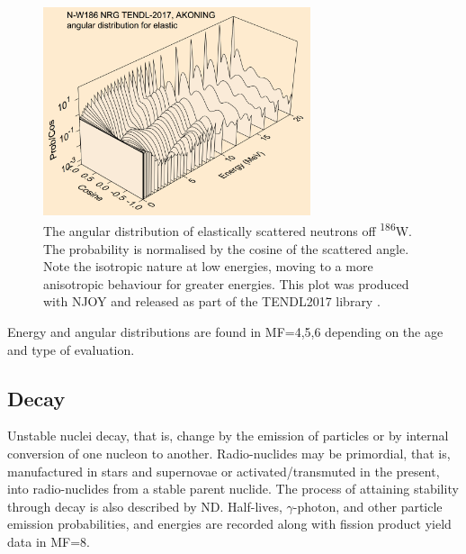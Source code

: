 \begin{figure}[ht]
  \centering
  \includegraphics[width=0.7\textwidth]{tungsten_scatter}
  \caption[Neutron elastic scattering angular distribution for $^{186}$W.]{The angular distribution of elastically scattered neutrons off \textsuperscript{186}W. The probability is normalised by the cosine of the scattered angle. Note the isotropic nature at low energies, moving to a more anisotropic behaviour for greater energies. This plot was produced with NJOY \cite{MacFarlane2010} and released as part of the TENDL2017 library \cite{Rochman2016}.}
  \label{fig:tungsten_scatter}
\end{figure}

Energy and angular distributions are found in MF=4,5,6 depending on the age and type of evaluation.

\subsection{Decay}
Unstable nuclei decay, that is, change by the emission of particles or by internal conversion of one nucleon to another. Radio-nuclides may be primordial, that is, manufactured in stars and supernovae or activated/transmuted in the present, into radio-nuclides from a stable parent nuclide. The process of attaining stability through decay is also described by ND. Half-lives, $\gamma$-photon, and other particle emission probabilities, and energies are recorded along with fission product yield data in MF=8. 

